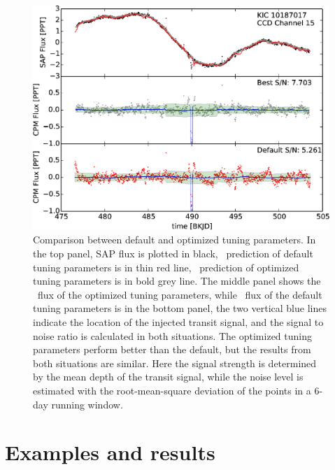 \begin{figure}[p]
\begin{center}
\includegraphics[width=\textwidth]{figures/cpm/f3}
\end{center}
\caption{
  \label{hyperparameter}
  Comparison between default and optimized tuning parameters. 
  In the top panel, SAP flux is plotted in black, 
    \name\ prediction of default tuning parameters is in thin red line, 
    \name\ prediction of optimized tuning parameters is in bold grey line. 
  The middle panel shows the \name\ flux of the optimized tuning parameters, while \name\ flux of the default tuning parameters is in the bottom panel, the two vertical blue lines indicate the location of the injected transit signal, and the signal to noise ratio is calculated in both situations.
  The optimized tuning parameters perform better than the default, but the results from both situations are similar.
  Here the signal strength is determined by the mean depth of the transit signal, while the noise level is estimated with the root-mean-square deviation of the points in a 6-day running window.
}
\end{figure}

\section{Examples and results}

